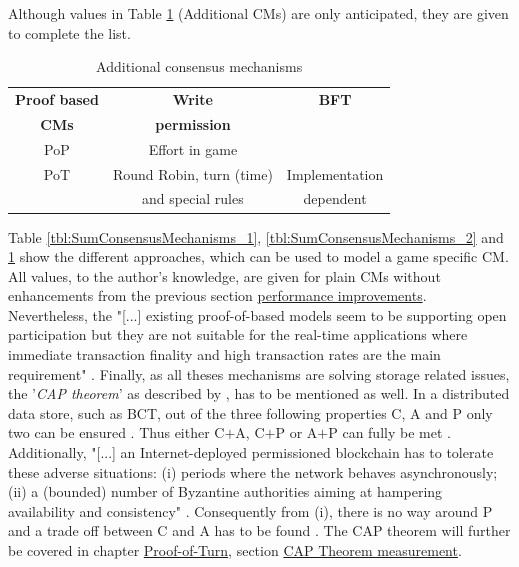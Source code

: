 \noindent Although values in Table \ref{tbl:SumConsensusMechanisms_3} (Additional \gls{CM}s) are only anticipated, they are given to complete the list.
\begin{table}
	\centering
	\begin{tabularx}{0.75\textwidth}{ c | c | c }
		\textbf{Proof based} & \textbf{Write} & \textbf{\gls{BFT}} \\
		\textbf{\gls{CM}s} & \textbf{permission} & \\ \hline \hline
		\gls{PoP} & Effort in game & \textminus  \\ \hline
		\gls{PoT} & Round Robin, turn (time)  & Implementation \\
		 & and special rules & dependent \\ \hline
	\end{tabularx}
	\caption{Additional consensus mechanisms}
	\label{tbl:SumConsensusMechanisms_3}
\end{table}
\noindent Table \ref{tbl:SumConsensusMechanisms_1}, \ref{tbl:SumConsensusMechanisms_2} and
\ref{tbl:SumConsensusMechanisms_3} show the different approaches, which can be used to model a game specific \gls{CM}.
All values, to the author's knowledge, are given for plain \gls{CM}s without enhancements from the previous section \hyperref[sec:PerformanceImprovements]{performance improvements}. \\
Nevertheless, the "[...] existing proof-of-based models seem to be supporting open participation
but they are not suitable for the real-time applications where immediate
transaction finality and high transaction rates are the main requirement" \cite[6]{Khan.2020}.
Finally, as all theses mechanisms are solving storage related issues, the '\textit{CAP theorem}' as described by \cite{Brewer.2012}, has to be mentioned as well.
In a distributed data store, such as \gls{BCT}, out of the three following properties \gls{C}, \gls{A} and \gls{P} only two can be ensured \cite[6]{Angelis.2018}.
Thus either \gls{C}$+$\gls{A}, \gls{C}$+$\gls{P} or \gls{A}$+$\gls{P} can fully be met \cite[6]{Angelis.2018}.
Additionally, "[...] an Internet-deployed permissioned blockchain has to tolerate these adverse situations:
(i) periods where the network behaves asynchronously;
(ii) a (bounded) number of Byzantine authorities aiming at hampering availability and consistency" \cite[7]{Angelis.2018}.
Consequently from (i), there is no way around \gls{P} and a trade off between \gls{C} and \gls{A} has to be found \cite[7]{Angelis.2018}.
The CAP theorem will further be covered in chapter \hyperref[chap:PoT]{Proof-of-Turn}, section \hyperref[sec:CAPtheorem]{CAP Theorem measurement}. \\

